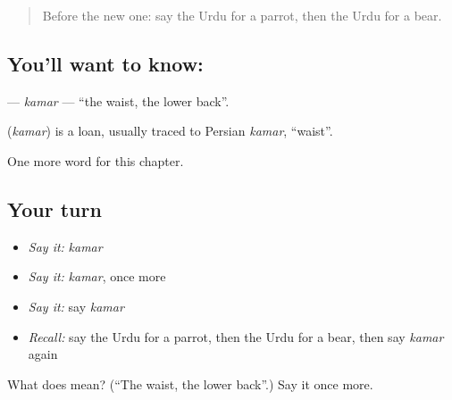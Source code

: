 \label{lesson:UR-C128-kamar}



\begin{quote}
Before the new one: say the Urdu for a parrot, then the Urdu for a bear.
\end{quote}

\subsection*{You'll want to know: }
\textbf{} — \emph{kamar} — \textquotedblleft{}the waist, the lower back\textquotedblright{}.

\begin{cousinweb}
\textbf{} (\emph{kamar}) is a loan, usually traced to Persian \emph{kamar}, \textquotedblleft{}waist\textquotedblright{}.
\end{cousinweb}

\begin{grammarlens}[title={What you've built}]
One more word for this chapter.
\end{grammarlens}

\subsection*{Your turn}
\begin{itemize}
\raggedright
  \item \emph{Say it:} \emph{kamar}
  \item \emph{Say it:} \emph{kamar}, once more
  \item \emph{Say it:} say \emph{kamar}
  \item \emph{Recall:} say the Urdu for a parrot, then the Urdu for a bear, then say \emph{kamar} again
\end{itemize}

\begin{tcolorbox}[breakable,colback=teal!4,colframe=teal!35!black,title={Before you move on}]
What does  mean? (\textquotedblleft{}The waist, the lower back\textquotedblright{}.) Say it once more.
\end{tcolorbox}
